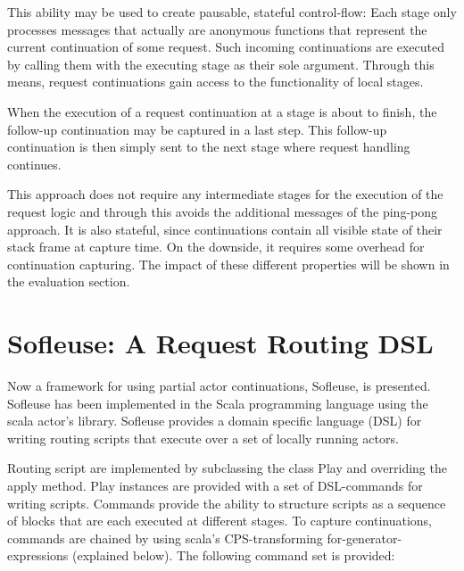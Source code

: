 \documentclass{sig-alternate}
\begin{document}
This ability may be used to create pausable, stateful control-flow: Each stage only processes
messages that actually are anonymous functions that represent the current continuation of some
request. Such incoming continuations are executed by calling them with the executing stage as their
sole argument. Through this means, request continuations gain access to the functionality of local
stages.

When the execution of a request continuation at a stage is about to finish, the follow-up 
continuation may be captured in a last step.  This follow-up continuation is then simply sent
to the next stage where request handling continues.  

This approach does not require any intermediate stages for the execution of the request logic and
through this avoids the additional messages of the ping-pong approach. It is also stateful, since
continuations contain all visible state of their stack frame at capture time. On the downside, it
requires some overhead for continuation capturing. The impact of these different properties will be
shown in the evaluation section.

                         



\section{Sofleuse: A Request Routing DSL}

Now a framework for using partial actor continuations, Sofleuse, is presented. Sofleuse has been
implemented in the Scala programming language using the scala actor's library. Sofleuse provides a
domain specific language (DSL) for writing routing scripts that execute over a set of locally
running actors.

Routing script are implemented by subclassing the class Play and overriding the apply method. Play
instances are provided with a set of DSL-commands for writing scripts. Commands provide the ability
to structure scripts as a sequence of blocks that are each executed at different stages. To capture
continuations, commands are chained by using scala's CPS-transforming for-generator-expressions
(explained below). The following command set is provided:
\end{document}
